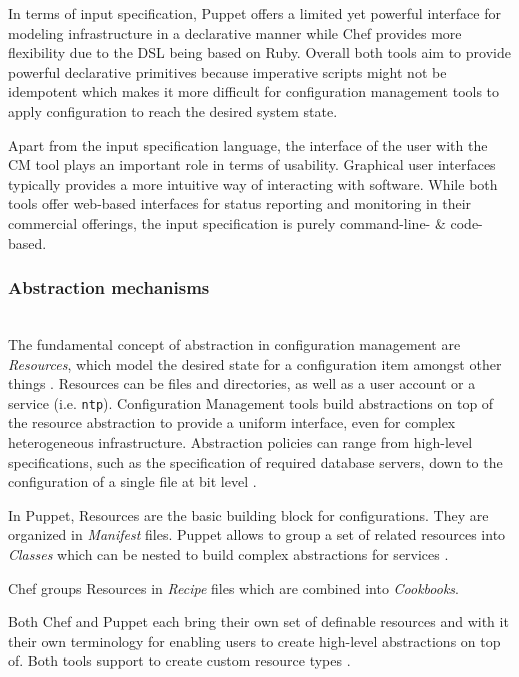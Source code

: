 
In terms of input specification, Puppet offers a limited yet powerful interface for modeling infrastructure in a declarative manner while Chef provides more flexibility due to the DSL being based on Ruby. Overall both tools aim to provide powerful declarative primitives because imperative scripts might not be idempotent which makes it more difficult for configuration management tools to apply configuration to reach the desired system state.

Apart from the input specification language, the interface of the user with the CM tool plays an important role in terms of usability. Graphical user interfaces typically provides a more intuitive way of interacting with software. While both tools offer web-based interfaces for status reporting and monitoring in their commercial offerings, the input specification is purely command-line- \& code-based.

\subsubsection{Abstraction mechanisms}\hfill\\

The fundamental concept of abstraction in configuration management are \textit{Resources}, which model the desired state for a configuration item amongst other things \cite{chefioresource}. Resources can be files and directories, as well as a user account or a service (i.e. \texttt{ntp}). Configuration Management tools build abstractions on top of the resource abstraction to provide a uniform interface, even for complex heterogeneous infrastructure. Abstraction policies can range from high-level specifications, such as the specification of required database servers, down to the configuration of a single file at bit level \cite{delaet2010survey}.

In Puppet, Resources are the basic building block for configurations. They are organized in \textit{Manifest} files. Puppet allows to group a set of related resources into \textit{Classes} which can be nested to build complex abstractions for services \cite{puppetcomlangsum}.

Chef groups Resources in \textit{Recipe} files which are combined into \textit{Cookbooks}. 

Both Chef and Puppet each bring their own set of definable resources and with it their own terminology for enabling users to create high-level abstractions on top of. Both tools support to create custom resource types \cite{chefcustomresources}\cite{puppetcustomtypes}.


